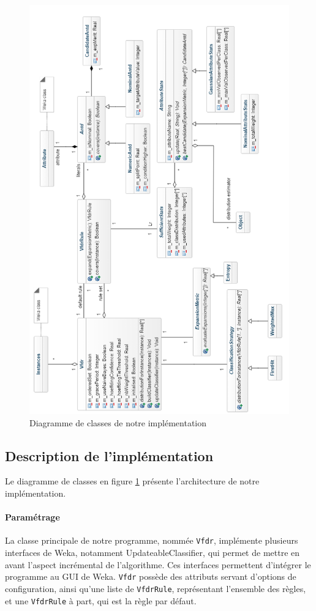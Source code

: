     \begin{figure}
        \includegraphics[width=\textwidth]{SOURCES/image2}
        \caption{Diagramme de classes de notre implémentation}
        \label{fig:dclass}
    \end{figure}


    \subsection{Description de l'implémentation}

        Le diagramme de classes en figure \ref{fig:dclass} présente l'architecture de notre implémentation.

        \paragraph{Paramétrage} La classe principale de notre programme, nommée \texttt{Vfdr}, implémente plusieurs interfaces de Weka, notamment UpdateableClassifier, qui permet de mettre en avant l’aspect incrémental de l’algorithme. Ces interfaces permettent d'intégrer le programme au GUI de Weka. \texttt{Vfdr} possède des attributs servant d’options de configuration, ainsi qu’une liste de \texttt{VfdrRule}, représentant l’ensemble des règles, et une \texttt{VfdrRule} à part, qui est la règle par défaut.

